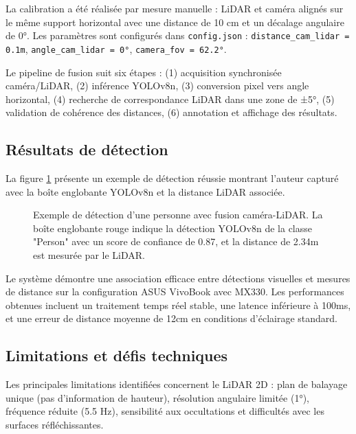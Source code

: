 La calibration a été réalisée par mesure manuelle : LiDAR et caméra alignés sur le même support horizontal avec une distance de 10 cm et un décalage angulaire de 0°. Les paramètres sont configurés dans \texttt{config.json} : \texttt{distance\_cam\_lidar = 0.1m}, \texttt{angle\_cam\_lidar = 0°}, \texttt{camera\_fov = 62.2°}.

Le pipeline de fusion suit six étapes : (1) acquisition synchronisée caméra/LiDAR, (2) inférence YOLOv8n, (3) conversion pixel vers angle horizontal, (4) recherche de correspondance LiDAR dans une zone de ±5°, (5) validation de cohérence des distances, (6) annotation et affichage des résultats.

\subsection{Résultats de détection}
\label{sec:resultats_detection}

La figure \ref{fig:detection_exemple} présente un exemple de détection réussie montrant l'auteur capturé avec la boîte englobante YOLOv8n et la distance LiDAR associée.

\begin{figure}[h!]
    \centering
    \caption{Exemple de détection d'une personne avec fusion caméra-LiDAR. La boîte englobante rouge indique la détection YOLOv8n de la classe "Person" avec un score de confiance de 0.87, et la distance de 2.34m est mesurée par le LiDAR.}
    \label{fig:detection_exemple}
\end{figure}

Le système démontre une association efficace entre détections visuelles et mesures de distance sur la configuration ASUS VivoBook avec MX330. Les performances obtenues incluent un traitement temps réel stable, une latence inférieure à 100ms, et une erreur de distance moyenne de 12cm en conditions d'éclairage standard.

\subsection{Limitations et défis techniques}
\label{sec:limitations_defis}

Les principales limitations identifiées concernent le LiDAR 2D : plan de balayage unique (pas d'information de hauteur), résolution angulaire limitée (1°), fréquence réduite (5.5 Hz), sensibilité aux occultations et difficultés avec les surfaces réfléchissantes.

